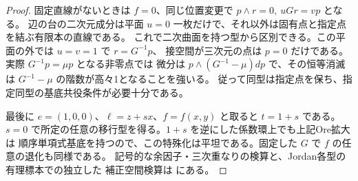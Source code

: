 \begin{proof}
固定直線がないときは $f=0$、同じ位置変更で $p\wedge r=0,\ u G r=vp$ となる。
辺の台の二次元成分は平面 $u=0$ 一枚だけで、それ以外は固有点と指定点を結ぶ有限本の直線である。
これで二次曲面を持つ型から区別できる。この平面の外では $u=v=1$ で $r=G^{-1}p$、
接空間が三次元の点は $p=0$ だけである。実際 $G^{-1}p=\mu p$ となる非零点では
微分は $p\wedge(G^{-1}-\mu)dp$ で、その恒等消滅は $G^{-1}-\mu$ の階数が高々1となることを強いる。
従って同型は指定点を保ち、指定同型の基底共役条件が必要十分である。

最後に $e=(1,0,0)$、$\ell=z+s x$、$f=f(x,y)$ と取ると $t=1+s$ である。
$s=0$ で所定の任意の移行型を得る。$1+s$ を逆にした係数環上でも上記Ore拡大は
順序単項式基底を持つので、この特殊化は平坦である。固定した $G$ で $f$ の任意の退化も同様である。
記号的な余因子・三次重なりの検算と、Jordan各型の有理標本での独立した
補正空間検算は  にある。
\end{proof}
